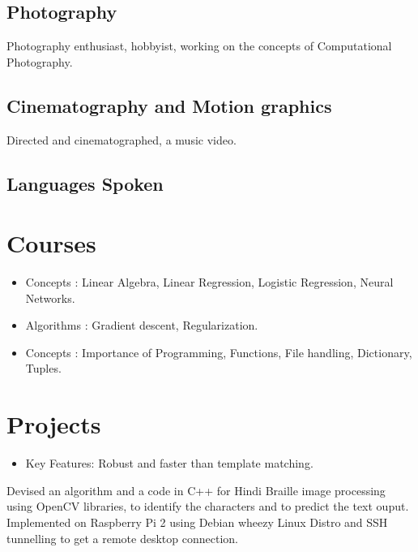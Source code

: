 \documentclass{Resume}
\begin{document}
\subsection{Photography}
{Photography enthusiast, hobbyist, working on the concepts of Computational Photography.}

\subsection{Cinematography and Motion graphics}
{Directed and cinematographed, a music video.}

\subsection{Languages Spoken}

\section{Courses \faCogs}
\begin{itemize}
\item Concepts : Linear Algebra, Linear Regression, Logistic Regression, Neural Networks.
\item Algorithms : Gradient descent, Regularization.
\end{itemize}
\begin{itemize}
\item Concepts : Importance of Programming, Functions, File handling, Dictionary, Tuples. \\
\end{itemize}

\section{Projects \faLightbulb}

\begin{itemize} 
\item Key Features: Robust and faster than template matching.
\end{itemize}
{Devised an algorithm and a code in C++ for Hindi Braille image processing using OpenCV libraries, to identify the characters and to predict the text ouput. Implemented on Raspberry Pi 2 using Debian wheezy Linux Distro and SSH tunnelling to get a remote desktop connection.\\}
\end{document}
